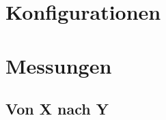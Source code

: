 \appendix

\section{Konfigurationen}
\label{appendix:configurations}

% 

% 

\section{Messungen}
\label{appendix:measures}
\subsection{Von X nach Y}




%  
% 

